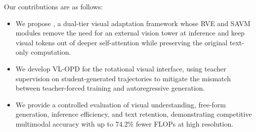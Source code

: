 Our contributions are as follows:
\begin{itemize}
    \item We propose \modelname, a dual-tier visual adaptation framework
    whose RVE and SAVM modules remove the need for an external vision
    tower at inference and keep visual tokens out of deeper
    self-attention while preserving the original text-only computation.

    \item We develop VL-OPD for the rotational visual interface, using
    teacher supervision on student-generated trajectories to mitigate
    the mismatch between teacher-forced training and autoregressive
    generation.

    \item We provide a controlled evaluation of visual understanding,
    free-form generation, inference efficiency, and text retention,
    demonstrating competitive multimodal accuracy with up to 74.2\%
    fewer FLOPs at high resolution.
\end{itemize}
